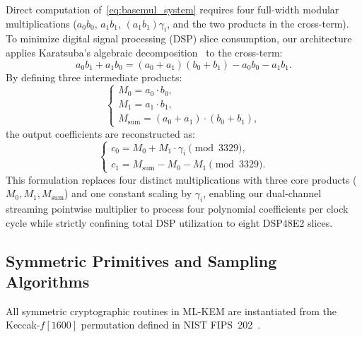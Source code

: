 Direct computation of~\eqref{eq:basemul_system} requires four full-width modular multiplications ($a_0 b_0$, $a_1 b_1$, $(a_1 b_1)\gamma_i$, and the two products in the cross-term). To minimize digital signal processing (DSP) slice consumption, our architecture applies Karatsuba's algebraic decomposition~\cite{karatsuba1962} to the cross-term:
\begin{equation}
\label{eq:karatsuba_cross}
a_0 b_1 + a_1 b_0 = (a_0 + a_1)(b_0 + b_1) - a_0 b_0 - a_1 b_1.
\end{equation}
By defining three intermediate products:
\begin{equation}
\label{eq:karatsuba_intermediates}
\begin{cases}
M_0 = a_0 \cdot b_0, \\
M_1 = a_1 \cdot b_1, \\
M_{\text{sum}} = (a_0 + a_1) \cdot (b_0 + b_1),
\end{cases}
\end{equation}
the output coefficients are reconstructed as:
\begin{equation}
\label{eq:karatsuba_outputs}
\begin{cases}
c_0 = M_0 + M_1 \cdot \gamma_i \pmod{3329}, \\
c_1 = M_{\text{sum}} - M_0 - M_1 \pmod{3329}.
\end{cases}
\end{equation}
This formulation replaces four distinct multiplications with three core products ($M_0, M_1, M_{\text{sum}}$) and one constant scaling by $\gamma_i$, enabling our dual-channel streaming pointwise multiplier to process four polynomial coefficients per clock cycle while strictly confining total DSP utilization to eight DSP48E2 slices.

\subsection{Symmetric Primitives and Sampling Algorithms}
\label{sec:prelim_symmetric}

All symmetric cryptographic routines in \mbox{ML-KEM} are instantiated from the Keccak-$f[1600]$ permutation defined in NIST FIPS~202~\cite{fips202}.

